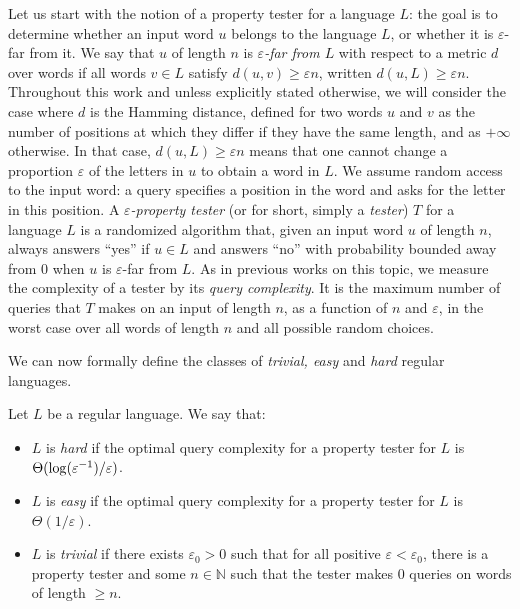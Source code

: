 \documentclass[letterpaper, USenglish, cleveref, autoref, thm-restate, numberwithinsect]{lipics-v2021}
\theoremstyle{theorem}
\theoremstyle{definition}
\newcommand{\eps}{\varepsilon}
\newcommand{\NN}{\mathbb{N}}
\newcommand{\epslogeps}[1][]
{\ifthenelse{\equal{#1}{}}{\log(\eps^{-1})/\eps}{\log^{ #1 }(\eps^{-1})/\eps}}
\begin{document}
Let us start with the notion of a property tester for a language $L$: the goal is to determine whether an input word $u$ belongs to the language $L$, or whether it is $\eps$-far from it. 
We say that $u$ of length $n$ is \emph{$\eps$-far from $L$} with respect to a metric $d$ over words if all words $v \in L$ satisfy $d(u, v) \ge \eps n$, written $d(u,L) \ge \eps n$.
Throughout this work and unless explicitly stated otherwise, we will consider the case where $d$ is the Hamming distance, defined for two words $u$ and $v$ as the number of positions at which they differ if they have the same length, and as $+\infty$ otherwise.
In that case, $d(u,L) \ge \eps n$ means that one cannot change a proportion $\eps$ of the letters in $u$ to obtain a word in $L$.
We assume random access to the input word: a query specifies a position in the word and asks for the letter in this position. 
A \emph{$\eps$-property tester} (or for short, simply a \emph{tester}) $T$ for a language $L$ is a randomized algorithm that, given an input word $u$ of length $n$, always answers ``yes'' if $u\in L$ and answers ``no'' with probability bounded away from 0 when $u$ is $\eps$-far from $L$. 
As in previous works on this topic, we measure the complexity of a tester by its \emph{query complexity}. It is the maximum number of queries that $T$ makes on an input of length $n$, as a function of $n$ and $\eps$, in the worst case over all words of length $n$ and all possible random choices.

We can now formally define the classes of \emph{trivial, easy} and \emph{hard} regular languages.
\begin{definition}
	Let $L$ be a regular language. We say that:
	\begin{itemize}
		\item $L$ is \emph{hard} if  the optimal query complexity for a property tester for $L$ is $\Theta(\epslogeps)$.
		
		\item $L$ is \emph{easy} if the optimal query complexity for a property tester for $L$ is $\Theta(1/\eps)$.
		
		\item $L$ is \emph{trivial} if there exists $\eps_0> 0$ such that for all positive $\eps < \eps_0$, there is a property tester and some $n \in \NN$ such that the tester makes $0$ queries on words of length $\geq n$.
	\end{itemize}
\end{definition}
\end{document}

